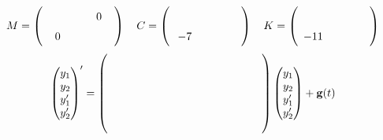 \documentclass[11pt,letterpaper]{article}
\newcommand{\matrixentry}{\makebox[0.38in]{}\rule[-0.08in]{0pt}{0.25in}}
\newenvironment{answerarea}{%
  \par\noindent\begin{lrbox}{\AnswerAreaBox}\begin{minipage}{\dimexpr\linewidth-2\fboxsep-2\fboxrule\relax}%
  \setlength{\abovedisplayskip}{4pt}\setlength{\belowdisplayskip}{4pt}%
  \setlength{\abovedisplayshortskip}{4pt}\setlength{\belowdisplayshortskip}{4pt}%
}{%
  \end{minipage}\end{lrbox}\fbox{\usebox{\AnswerAreaBox}}\par
}
\begin{document}
\begin{enumerate}
\noindent{}
\begin{answerarea}
\[
M=\begin{pmatrix}\matrixentry&0\\0&\matrixentry\end{pmatrix}
\quad
C=\begin{pmatrix}\matrixentry&\matrixentry\\-7&\matrixentry\end{pmatrix}
\quad
K=\begin{pmatrix}\matrixentry&\matrixentry\\-11&\matrixentry\end{pmatrix}
\]
\[
\begin{pmatrix}y_1\\y_2\\y_1'\\y_2'\end{pmatrix}'=
\begin{pmatrix}
\matrixentry&\matrixentry&\matrixentry&\matrixentry\\
\matrixentry&\matrixentry&\matrixentry&\matrixentry\\
\matrixentry&\matrixentry&\matrixentry&\matrixentry\\
\matrixentry&\matrixentry&\matrixentry&\matrixentry
\end{pmatrix}
\begin{pmatrix}y_1\\y_2\\y_1'\\y_2'\end{pmatrix}
+\vect{g}(t)
\]
\end{answerarea}


\end{enumerate}
\end{document}
